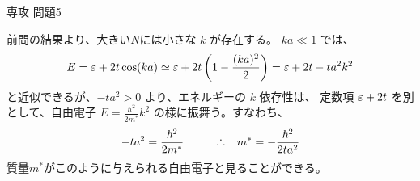 \documentclass[fleqn]{jbook}
\begin{document}
\begin{answer}{専攻 問題5}{}
\begin{subanswers}
\begin{subsubanswers}
  \SubSubAnswer
    前問の結果より、大きい$N$には小さな $k$ が存在する。
    $ka\ll 1$ では、
%
    \[ E = \eps+2t\cos(ka)%
    \simeq \eps+2t\left(1-\frac{(ka)^2}{2}\right)%
         = \eps+2t-ta^2k^2 \]
%
    と近似できるが、$-ta^2>0$ より、エネルギーの $k$ 依存性は、
    定数項 $\varepsilon+2t$ を別として、自由電子
    $E=\frac{\hbar^2}{2m^{*}}k^2$ の様に振舞う。すなわち、
%
    \[ -ta^2 = \frac{\hbar^2}{2m^{*}} \hspace{10mm}%
         \Yueni m^{*} = -\frac{\hbar^2}{2ta^2} \]
%
    質量$m^{*}$がこのように与えられる自由電子と見ることができる。

  \end{subsubanswers}
\end{subanswers}
\end{answer}
\end{document}
